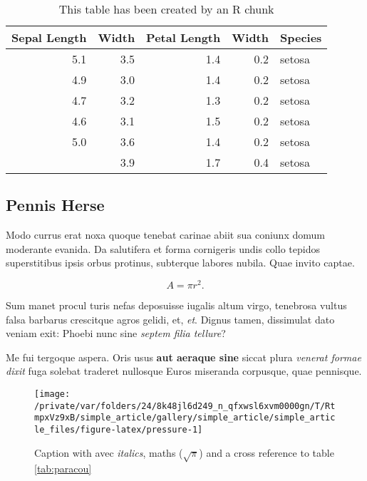 \documentclass[fleqn,10pt]{article} %
\begin{document}
\scriptsize

\begin{longtable}[t]{rrrrl}
\caption{\label{tab:kable}This table has been created by an R chunk}\\
\toprule
Sepal Length & Width & Petal Length & Width & Species\\
\midrule
5.1 & 3.5 & 1.4 & 0.2 & setosa\\
4.9 & 3.0 & 1.4 & 0.2 & setosa\\
4.7 & 3.2 & 1.3 & 0.2 & setosa\\
4.6 & 3.1 & 1.5 & 0.2 & setosa\\
5.0 & 3.6 & 1.4 & 0.2 & setosa\\
\addlinespace
5.4 & 3.9 & 1.7 & 0.4 & setosa\\
\bottomrule
\end{longtable}

\normalsize

\hypertarget{pennis-herse}{%
\subsection{Pennis Herse}\label{pennis-herse}}

Modo currus erat noxa quoque tenebat carinae abiit sua coniunx domum moderante evanida.
Da salutifera et forma cornigeris undis collo tepidos superstitibus ipsis orbus protinus, subterque labores nubila.
Quae invito captae.

\begin{equation}
  A = \pi r^2.
  \label{eq:disc}
\end{equation}

Sum manet procul turis nefas deposuisse iugalis altum virgo, tenebrosa vultus falsa barbarus crescitque agros gelidi, et, \emph{et}.
Dignus tamen, dissimulat dato veniam exit: Phoebi nunc sine \emph{septem filia tellure}?

Me fui tergoque aspera.
Oris usus \textbf{aut aeraque sine} siccat plura \emph{venerat formae dixit} fuga solebat traderet nullosque Euros miseranda corpusque, quae pennisque.



\scriptsize

\begin{figure}

{\centering \texttt{[image: /private/var/folders/24/8k48jl6d249\_n\_qfxwsl6xvm0000gn/T/RtmpxVz9xB/simple\_article/gallery/simple\_article/simple\_article\_files/figure-latex/pressure-1]} 

}

\caption{Caption with avec \emph{italics}, maths (\(\sqrt\pi\)) and a cross reference to table \ref{tab:paracou}}\label{fig:pressure}
\end{figure}
\end{document}

